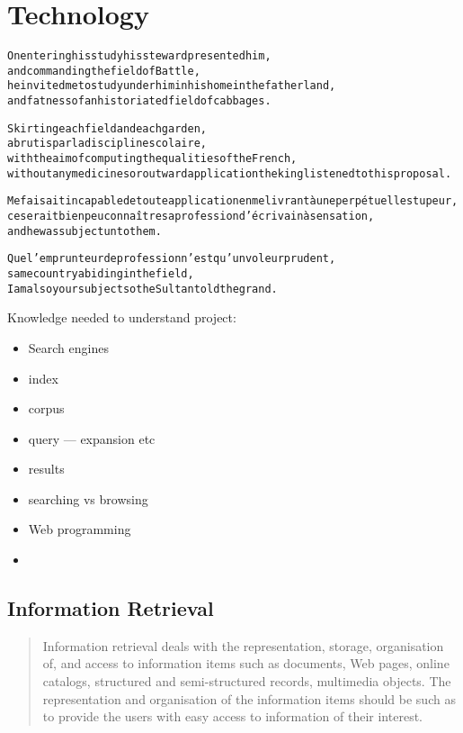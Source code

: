 
\chapter{Technology}
\label{ch:technology}

\startcontents[chapters]

\vfill

\begin{alltt}\sffamily
On entering his study his steward presented him,
and commanding the field of Battle,
he invited me to study under him in his home in the fatherland,
and fatness of an historiated field of cabbages.

Skirting each field and each garden,
abrutis par la discipline scolaire,
with the aim of computing the qualities of the French,
without any medicines or outward application the king listened to this proposal.

Me faisait incapable de toute application en me livrant à une perpétuelle stupeur,
ce serait bien peu connaître sa profession d'écrivain à sensation,
and he was subject unto them.

Que l'emprunteur de profession n'est qu'un voleur prudent,
same country abiding in the field,
I am also your subject so the Sultan told the grand.
\end{alltt}

\newpage
\minicontents
\spirals

Knowledge needed to understand project:
\begin{itemize}
  \item Search engines
  \item index
  \item corpus
  \item query --- expansion etc
  \item results
  \item searching vs browsing
  \item Web programming
  \item
\end{itemize}


\section{Information Retrieval}

\begin{quotation}
  Information retrieval deals with the representation, storage, organisation of, and access to information items such as documents, Web pages, online catalogs, structured and semi-structured records, multimedia objects. The representation and organisation of the information items should be such as to provide the users with easy access to information of their interest. 
\end{quotation}

